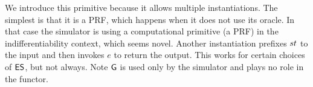 We introduce this primitive because it allows multiple instantiations. The simplest is that it is a PRF, which happens when it does not use its oracle. In that case the simulator is using a computational primitive (a PRF) in the indifferentiability context, which seems novel. Another instantiation prefixes $st$ to the input and then invokes $e$ to return the output. This works for certain choices of $\mathsf{ES}$, but not always. Note $\mathsf{G}$ is used only by the simulator and plays no role in the functor. 




















